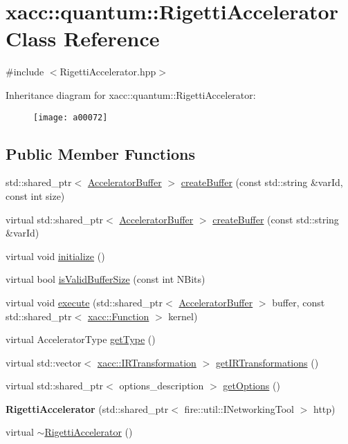 \hypertarget{a00072}{}\section{xacc\+:\+:quantum\+:\+:Rigetti\+Accelerator Class Reference}
\label{a00072}


{\ttfamily \#include $<$Rigetti\+Accelerator.\+hpp$>$}

Inheritance diagram for xacc\+:\+:quantum\+:\+:Rigetti\+Accelerator\+:\begin{figure}[H]
\begin{center}
\leavevmode
\texttt{[image: a00072]}
\end{center}
\end{figure}
\subsection*{Public Member Functions}
\begin{DoxyCompactItemize}
\item 
std\+::shared\+\_\+ptr$<$ \hyperlink{a00013}{Accelerator\+Buffer} $>$ \hyperlink{a00072_a731551c94b1abef40d2cf032e8712df6}{create\+Buffer} (const std\+::string \&var\+Id, const int size)
\item 
virtual std\+::shared\+\_\+ptr$<$ \hyperlink{a00013}{Accelerator\+Buffer} $>$ \hyperlink{a00072_ada3ceb986e51ab5aa721f2a08e083cd6}{create\+Buffer} (const std\+::string \&var\+Id)
\item 
virtual void \hyperlink{a00072_ab8b6af9bb9dcb110201e9ee5cac74b4f}{initialize} ()
\item 
virtual bool \hyperlink{a00072_a61352c07062597aad2393fbeed4cc025}{is\+Valid\+Buffer\+Size} (const int N\+Bits)
\item 
virtual void \hyperlink{a00072_afce7bbd1b0f04300a9920952e9d12ef4}{execute} (std\+::shared\+\_\+ptr$<$ \hyperlink{a00013}{Accelerator\+Buffer} $>$ buffer, const std\+::shared\+\_\+ptr$<$ \hyperlink{a00039}{xacc\+::\+Function} $>$ kernel)
\item 
virtual Accelerator\+Type \hyperlink{a00072_aab0d4674da5273d55407b9ab77cde890}{get\+Type} ()
\item 
virtual std\+::vector$<$ \hyperlink{a00052}{xacc\+::\+I\+R\+Transformation} $>$ \hyperlink{a00072_a443683a1dfb000603c640b2ee303cf66}{get\+I\+R\+Transformations} ()
\item 
virtual std\+::shared\+\_\+ptr$<$ options\+\_\+description $>$ \hyperlink{a00072_a9ee9e62aecbccf193894ca3388676f9f}{get\+Options} ()
\item 
{\bfseries Rigetti\+Accelerator} (std\+::shared\+\_\+ptr$<$ fire\+::util\+::\+I\+Networking\+Tool $>$ http)\hypertarget{a00072_aa92ba39441ec9c261fbddee23a84d6ac}{}\label{a00072_aa92ba39441ec9c261fbddee23a84d6ac}

\item 
virtual \hyperlink{a00072_a7c86895d1c29afa8b7e18476144a3fcf}{$\sim$\+Rigetti\+Accelerator} ()
\end{DoxyCompactItemize}
